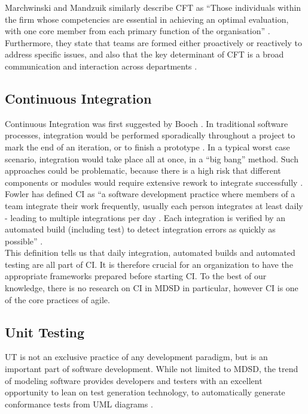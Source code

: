 \documentclass[fina_report_innit.tex]{subfiles}
\begin{document}
Marchwinski and Mandzuik similarly describe CFT as ``Those individuals within the firm whose competencies are essential in achieving an optimal evaluation, with one core member from each primary function of the organisation'' \cite{marchwinski2000technical}. Furthermore, they state that teams are formed either proactively or reactively to address specific issues, and also that the key determinant of CFT is a broad communication and interaction across departments \cite{marchwinski2000technical}.

\subsection{Continuous Integration}
Continuous Integration was first suggested by Booch \cite{booch2006object}. In traditional software processes, integration would be performed sporadically throughout a project to mark the end of an iteration, or to finish a prototype \cite{booch2006object}. In a typical worst case scenario, integration would take place all at once, in a “big bang” method. Such approaches could be problematic, because there is a high risk that different components or modules would require extensive rework to integrate successfully \cite{booch2006object}.
\\

Fowler has defined CI as “a software development practice where members of a team  integrate  their  work  frequently,  usually  each person  integrates  at  least  daily  -  leading  to  multiple integrations per day \cite{fowler2006continuous}. Each integration is verified by an automated build (including test) to detect integration errors as quickly as possible” \cite{fowler2006continuous}.
\\

This definition tells us that daily integration, automated builds and automated testing are all part of CI. It is therefore crucial for an organization to have the appropriate frameworks prepared before starting CI. To the best of our knowledge, there is no research on CI in MDSD in particular, however CI is one of the core practices of agile.

\subsection{Unit Testing}
UT is not an exclusive practice of any development paradigm, but is an important part of software development. While not limited to MDSD, the trend of modeling software provides developers and testers with an excellent opportunity to lean on test generation technology, to automatically generate conformance tests from UML diagrams \cite{mussa2009survey} \cite{hartmann2004uml}.  
\\
\end{document}
